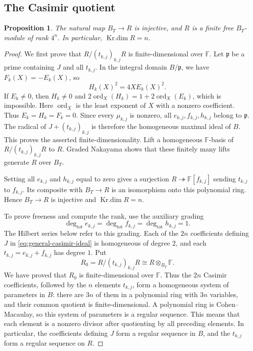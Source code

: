\documentclass[11pt]{article}
\numberwithin{equation}{section}
\newtheorem{proposition}[theorem]{Proposition}
\theoremstyle{definition}
\theoremstyle{remark}
\newcommand{\F}{\mathbb F}
\DeclareMathOperator{\Krdim}{Kr.dim}
\begin{document}
\subsection{The Casimir quotient}

\begin{proposition}\label{prop:general-casimir-freeness}
The natural map $B_T\longrightarrow R$ is injective, and
$R$ is a finite free $B_T$-module of rank $4^n$.
In particular, $\Krdim R=n$.
\end{proposition}

\begin{proof}
We first prove that
$R/(t_{k,j})_{k,j}R$ is finite-dimensional over $\F$.
Let $\mathfrak p$ be a prime containing $J$ and all $t_{k,j}$.
In the integral domain $B/\mathfrak p$,
we have $F_k(X)=-E_k(X)$, so
\[
 H_k(X)^2=4X E_k(X)^2.
\]
If $E_k\ne0$, then $H_k\ne0$ and
$2\operatorname{ord}_X(H_k)=1+2\operatorname{ord}_X(E_k)$,
which is impossible. Here $\operatorname{ord}_X$ is the least
exponent of $X$ with a nonzero coefficient. Thus $E_k=H_k=F_k=0$. Since every
$\mu_{k,j}$ is nonzero, all $e_{k,j},f_{k,j},h_{k,j}$ belong
to $\mathfrak p$.
The radical of $J+(t_{k,j})_{k,j}$ is therefore the
homogeneous maximal ideal of $B$. This proves the asserted
finite-dimensionality. Lift a homogeneous $\F$-basis of
$R/(t_{k,j})_{k,j}R$ to $R$. Graded Nakayama shows that these finitely
many lifts generate $R$ over $B_T$.

Setting all $e_{k,j}$ and $h_{k,j}$ equal to zero gives a surjection
$R\twoheadrightarrow\F[f_{k,j}]$ sending $t_{k,j}$ to $f_{k,j}$.
Its composite with $B_T\to R$ is an isomorphism onto this polynomial
ring. Hence $B_T\to R$ is injective and $\Krdim R=n$.

To prove freeness and compute the rank, use the auxiliary grading
\[
 \deg_{\mathrm{tot}} e_{k,j}=\deg_{\mathrm{tot}} f_{k,j}=\deg_{\mathrm{tot}} h_{k,j}=1.
\]
The Hilbert series below refer to this grading. Each of the $2n$
coefficients defining $J$ in \eqref{eq:general-casimir-ideal} is
homogeneous of degree $2$, and each $t_{k,j}=e_{k,j}+f_{k,j}$ has
degree $1$. Put
\[
 R_0=R/(t_{k,j})_{k,j}R\cong R\otimes_{B_T}\F.
\]
We have proved that $R_0$ is finite-dimensional over $\F$.
Thus the $2n$ Casimir coefficients, followed by the $n$ elements
$t_{k,j}$, form a homogeneous system of parameters in
$B$: there are $3n$ of them in a polynomial ring
with $3n$ variables, and their common quotient is finite-dimensional.
A polynomial ring is Cohen--Macaulay, so this system of parameters
is a regular sequence. This means that each element is a nonzero
divisor after quotienting by all preceding elements. In particular,
the coefficients defining $J$ form a regular sequence in
$B$, and the $t_{k,j}$ form a regular sequence on $R$.


\end{proof}
\end{document}
